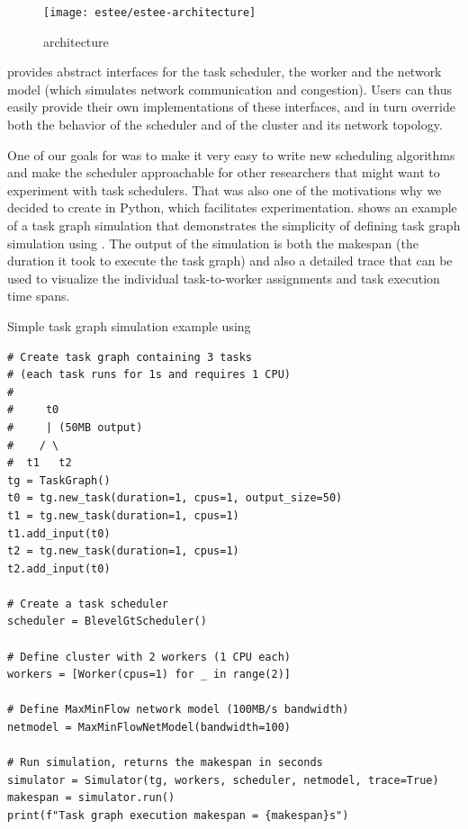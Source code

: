 \begin{figure}
	\centering
	\texttt{[image: estee/estee-architecture]}
	\caption{\estee{} architecture}
	\label{fig:estee-architecture}
\end{figure}

\estee{} provides abstract interfaces for the task scheduler, the worker and the
network model (which simulates network communication and congestion). Users can thus easily provide
their own implementations of these interfaces, and in turn override both the behavior of the
scheduler and of the cluster and its network topology.

One of our goals for \estee{} was to make it very easy to write new scheduling
algorithms and make the scheduler approachable for other researchers that might want to experiment
with task schedulers. That was also one of the motivations why we decided to create
\estee{} in Python, which facilitates experimentation.  shows
an example of a task graph simulation that demonstrates the simplicity of defining task graph
simulation using \estee{}. The output of the simulation is both the makespan (the
duration it took to execute the task graph) and also a detailed trace that can be used to visualize
the individual task-to-worker assignments and task execution time spans.

\begin{listing}
	\caption{Simple task graph simulation example using \estee{}}
	\label{lst:estee-example}
	\begin{verbatim}
# Create task graph containing 3 tasks
# (each task runs for 1s and requires 1 CPU)
#
#     t0
#     | (50MB output)
#    / \
#  t1   t2
tg = TaskGraph()
t0 = tg.new_task(duration=1, cpus=1, output_size=50)
t1 = tg.new_task(duration=1, cpus=1)
t1.add_input(t0)
t2 = tg.new_task(duration=1, cpus=1)
t2.add_input(t0)

# Create a task scheduler
scheduler = BlevelGtScheduler()

# Define cluster with 2 workers (1 CPU each)
workers = [Worker(cpus=1) for _ in range(2)]

# Define MaxMinFlow network model (100MB/s bandwidth)
netmodel = MaxMinFlowNetModel(bandwidth=100)

# Run simulation, returns the makespan in seconds
simulator = Simulator(tg, workers, scheduler, netmodel, trace=True)
makespan = simulator.run()
print(f"Task graph execution makespan = {makespan}s")
\end{verbatim}
\end{listing}

